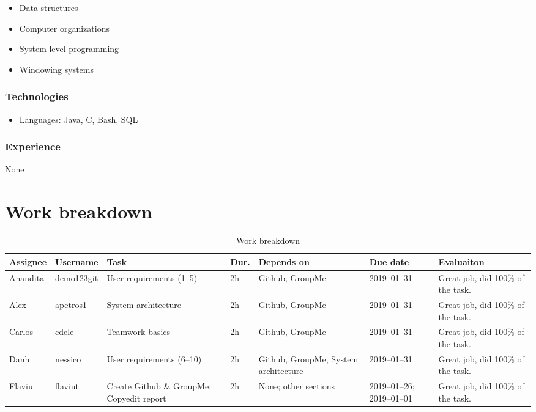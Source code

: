 \documentclass[
10pt, %
letterpaper, %
oneside, %
headinclude,footinclude, %
BCOR5mm, %
]{scrartcl}
\begin{document}
\begin{itemize}
\item
  Data structures
\item
  Computer organizations
\item
  System-level programming
\item
  Windowing systems
\end{itemize}

\subsubsection{Technologies}

\begin{itemize}
\item
  Languages: Java, C, Bash, SQL
\end{itemize}

\subsubsection{Experience}

None

\section{Work breakdown}

\begin{table}[H]
\begin{tabular}{@{}llp{2.5cm}p{1.2cm}p{1.5cm}p{2cm}p{2cm}@{}}
\toprule
Assignee & Username & Task & Dur. & Depends on & Due date & Evaluaiton\\ \midrule
Anandita & demo123git & User requirements (1--5) & 2h & Github, GroupMe & 2019--01--31 & Great job, did 100\% of the task.\\
Alex & apetros1 & System architecture & 2h & Github, GroupMe & 2019--01--31 & Great job, did 100\% of the task.\\
Carlos & cdele & Teamwork basics & 2h & Github, GroupMe & 2019--01--31 & Great job, did 100\% of the task.\\
Danh & nessico & User requirements (6--10) & 2h & Github, GroupMe, System architecture & 2019--01--31 & Great job, did 100\% of the task.\\
Flaviu & flaviut & Create Github \& GroupMe; Copyedit report & 2h & None; other sections & 2019--01--26; 2019--01--01 & Great job, did 100\% of the task.\\ \bottomrule
\end{tabular}
\caption{Work breakdown}
\end{table}
\end{document}
